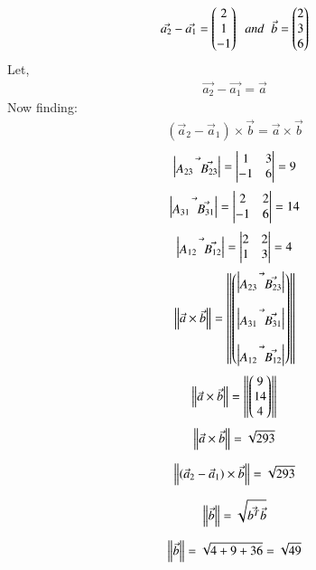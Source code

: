 \documentclass[journal]{IEEEtran}
\theoremstyle{remark}
\begin{document}
\begin{align}
   \Vec{a_2}-\Vec{a_1}=\begin{pmatrix}2\\1\\-1\end{pmatrix}\;\;and\;\;\Vec{b}=\begin{pmatrix}2\\3\\6\end{pmatrix}
\end{align}
Let,
\begin{align}
    \Vec{a_2}-\Vec{a_1}=\Vec{a}
\end{align}
Now finding:
\begin{align}
    (\Vec{a}_2 - \Vec{a}_1) \times \Vec{b}=\Vec{a}\times\Vec{b}
\end{align}
\begin{align}
   \begin{vmatrix}\Vec{A_{23} \;\; \Vec{B_{23}}}\end{vmatrix}=\begin{vmatrix}1&3\\-1&6\end{vmatrix}=9
\end{align}
\begin{align}
     \begin{vmatrix}\Vec{A_{31} \;\; \Vec{B_{31}}}\end{vmatrix}=\begin{vmatrix}2&2\\-1&6\end{vmatrix}=14
\end{align}
\begin{align}
     \begin{vmatrix}\Vec{A_{12} \;\; \Vec{B_{12}}}\end{vmatrix}=\begin{vmatrix}2&2\\1&3\end{vmatrix}=4
\end{align}
\begin{align}
     \left\lVert\Vec{a}\times\Vec{b}\right\rVert=\left\|\begin{pmatrix} \begin{vmatrix}\Vec{A_{23} \;\; \Vec{B_{23}}}\end{vmatrix} \\\\ \begin{vmatrix}\Vec{A_{31} \;\; \Vec{B_{31}}}\end{vmatrix} \\\\ \begin{vmatrix}\Vec{A_{12} \;\; \Vec{B_{12}}}\end{vmatrix}\end{pmatrix}  \right\|
\end{align}
\begin{align}
      \left\lVert\Vec{a}\times\Vec{b}\right\rVert=\left\|\begin{pmatrix}9\\ 14\\ 4\end{pmatrix}  \right\|
\end{align}
\begin{align}
       \left\lVert\Vec{a}\times\Vec{b}\right\rVert=\sqrt{293}
\end{align}

\begin{align}
     \left\lVert(\Vec{a}_2 - \Vec{a}_1) \times \Vec{b}\right\rVert=\sqrt{293}
\end{align}

\begin{align}
\left\lVert\Vec{b}\right\rVert=\sqrt{\Vec{b^T}\Vec{b}}
  \end{align}

\begin{align}
   \left\lVert\Vec{b}\right\rVert=\sqrt{4+9+36}=\sqrt{49}
\end{align}
\end{document}
